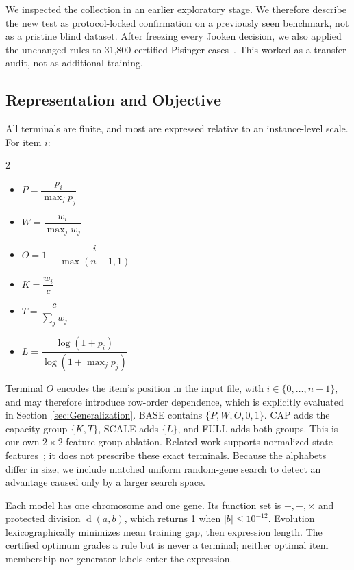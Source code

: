 \documentclass[conference]{IEEEtran}
\newcommand{\pdiv}{\operatorname{d}}
\begin{document}
We inspected the collection in an earlier exploratory stage. We therefore describe the new test as protocol-locked confirmation on a previously seen benchmark, not as a pristine blind dataset. After freezing every Jooken decision, we also applied the unchanged rules to 31,800 certified Pisinger cases~\cite{pisinger2005}. This worked as a transfer audit, not as additional training.

\subsection{Representation and Objective}

All terminals are finite, and most are expressed relative to an instance-level scale. For item $i$: 

\begin{multicols}{2}
\begin{itemize}
    \item $P = \dfrac{p_i}{\max_j p_j}$
    \item $W = \dfrac{w_i}{\max_j w_j}$
    \item $O = 1-\dfrac{i}{\max(n-1,1)}$
    \item $K = \dfrac{w_i}{c}$
    \item $T = \dfrac{c}{\sum_j w_j}$
    \item $L = \dfrac{\log(1+p_i)}
                     {\log(1+\max_j p_j)}$
\end{itemize}
\end{multicols}

Terminal $O$ encodes the item's position in the input file, with $i \in \{0,\ldots,n-1\}$, and may therefore introduce row-order
dependence, which is explicitly evaluated in Section~\ref{sec:Generalization}. BASE contains $\{P, W, O, 0, 1\}$. CAP adds the capacity group $\{K, T\}$, SCALE adds $\{L\}$, and FULL adds both groups. This is our own $2\times2$ feature-group ablation. Related work supports normalized state features~\cite{ortiz2013}; it does not prescribe these exact terminals. Because the alphabets differ in size, we include matched uniform random-gene search to detect an advantage caused only by a larger search space.

Each model has one chromosome and one gene. Its function set is $+, -, \times$ and protected division $\pdiv(a, b)$, which returns 1 when $|b| \leq 10^{-12}$. Evolution lexicographically minimizes mean training gap, then expression length. The certified optimum grades a rule but is never a terminal; neither optimal item membership nor generator labels enter the expression.
\end{document}
